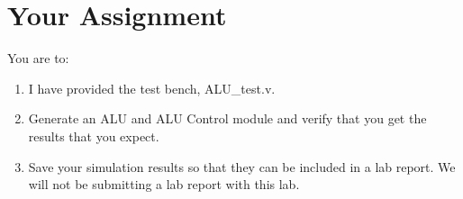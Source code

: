 \section{Your Assignment}

You are to:
\begin{enumerate}
\item I have provided the test bench, ALU\_test.v.
\item Generate an ALU and ALU Control module and verify that you get the results that you expect.
\item Save your simulation results so that they can be included in a lab report.  We will not be submitting a lab report with this lab.
\end{enumerate} 